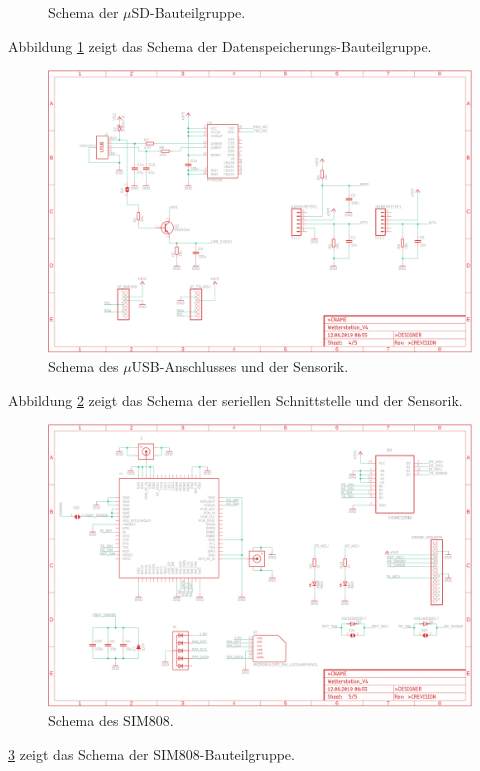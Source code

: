 \begin{appendix}
\begin{landscape}
\begin{figure}[h]
\caption{Schema der $\mu$SD-Bauteilgruppe.}
\label{fig:Anhang_uSDCard}
\end{figure}
Abbildung \ref{fig:Anhang_uSDCard} zeigt das Schema der Datenspeicherungs-Bauteilgruppe.
\newpage
\begin{figure}[h]
\centering
\includegraphics[width=0.7\linewidth]{graphics/Anhang_Eagle/IfAndSense.png}
\caption{Schema des $\mu$USB-Anschlusses und der Sensorik.}
\label{fig:Anhang_IfAndSense}
\end{figure}
Abbildung \ref{fig:Anhang_IfAndSense} zeigt das Schema der seriellen Schnittstelle und der Sensorik.
\newpage
\begin{figure}[h]
\centering
\includegraphics[width=0.7\linewidth]{graphics/Anhang_Eagle/SIM808.png}
\caption{Schema des SIM808.}
\label{fig:Anhang_SIM808}
\end{figure}
\ref{fig:Anhang_SIM808} zeigt das Schema der SIM808-Bauteilgruppe.
\end{landscape}
\newpage

\end{appendix}
